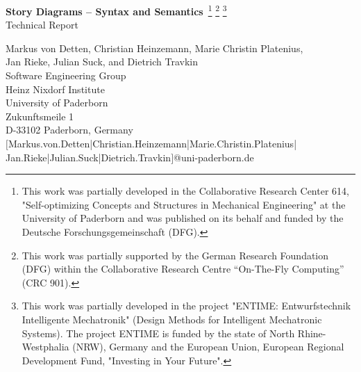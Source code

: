 \documentclass[12pt,a4paper,twoside,titlepage,openright,headsepline,listof=totoc,index=totoc,chapterprefix,bibliography=totoc]{scrreprt}
\theoremstyle{break}
\begin{document}


	\setcounter{page}{1}

	\begin{titlepage}
	\thispagestyle{empty}
	{\center

			\vspace{1.5cm}
            {\LARGE  {\bf Story Diagrams -- Syntax and Semantics}\,
             \footnote{This work was partially developed in the Collaborative Research Center %
             614, "Self-optimizing Concepts and Structures in Mechanical Engineering" at the University of Paderborn
             and was published on its behalf and funded by the Deutsche Forschungsgemeinschaft (DFG).}
             \footnote{This work was partially supported by the German Research Foundation (DFG) within the 
             Collaborative Research Centre ``On-The-Fly Computing'' (CRC 901).}
             \footnote{This work was partially developed in the project "ENTIME: Entwurfstechnik Intelligente Mechatronik" (Design Methods for Intelligent Mechatronic Systems).
             The project ENTIME is funded by the state of North Rhine-Westphalia (NRW), Germany and the European Union, European Regional Development Fund, "Investing in Your Future".}}
			\\
			\vspace{1.5cm}
			{\Large Technical Report} \\
			\vspace{1.25cm}
			 
			
			Markus von Detten, Christian Heinzemann, Marie Christin Platenius, \\
			Jan Rieke, Julian Suck, and Dietrich Travkin \\
			Software Engineering Group\\			
			Heinz Nixdorf Institute\\
			University of Paderborn\\
			Zukunftsmeile 1\\
			D-33102 Paderborn, Germany\\
			$[$Markus.von.Detten|Christian.Heinzemann|Marie.Christin.Platenius|\\
			Jan.Rieke|Julian.Suck|Dietrich.Travkin$]$@uni-paderborn.de\\

}
\end{titlepage}
\end{document}
